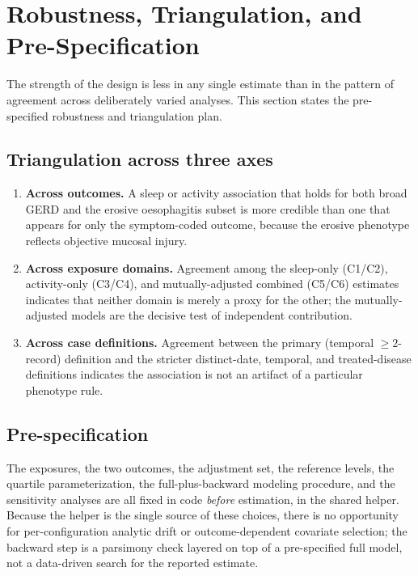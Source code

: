 \documentclass[11pt]{article}
\begin{document}
\section{Robustness, Triangulation, and Pre-Specification}
The strength of the design is less in any single estimate than in the pattern of agreement across
deliberately varied analyses. This section states the pre-specified robustness and triangulation plan.

\subsection{Triangulation across three axes}
\begin{enumerate}[leftmargin=1.6em,itemsep=2pt]
  \item \textbf{Across outcomes.} A sleep or activity association that holds for both broad GERD and the
  erosive oesophagitis subset is more credible than one that appears for only the symptom-coded outcome,
  because the erosive phenotype reflects objective mucosal injury.
  \item \textbf{Across exposure domains.} Agreement among the sleep-only (C1/C2), activity-only (C3/C4),
  and mutually-adjusted combined (C5/C6) estimates indicates that neither domain is merely a proxy for
  the other; the mutually-adjusted models are the decisive test of independent contribution.
  \item \textbf{Across case definitions.} Agreement between the primary (temporal $\geq 2$-record) definition and
  the stricter distinct-date, temporal, and treated-disease definitions indicates the association is not
  an artifact of a particular phenotype rule.
\end{enumerate}

\subsection{Pre-specification}
The exposures, the two outcomes, the adjustment set, the reference levels, the quartile
parameterization, the full-plus-backward modeling procedure, and the sensitivity analyses are all fixed
in code \emph{before} estimation, in the shared helper. Because the helper is the single source of these
choices, there is no opportunity for per-configuration analytic drift or outcome-dependent covariate
selection; the backward step is a parsimony check layered on top of a pre-specified full model, not a
data-driven search for the reported estimate.
\end{document}
